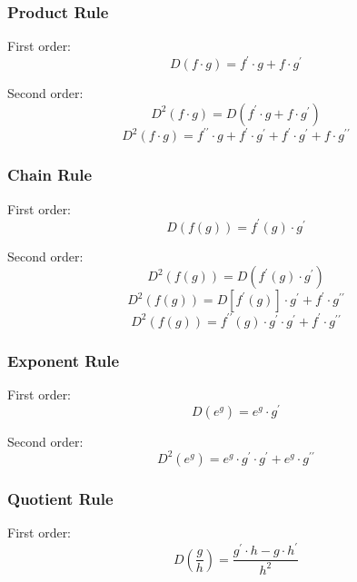 \documentclass[11pt, oneside]{article}
\begin{document}
\subsubsection{Product Rule}

First order:
\begin{equation}
D(f \cdot g) = f^\prime \cdot g + f \cdot g^\prime
\end{equation}

Second order:
\begin{equation}
D^2(f \cdot g) = D(f^\prime \cdot g + f \cdot g^\prime) 
\end{equation}
\begin{equation}
D^2(f \cdot g) = f^{\prime\prime} \cdot g + f^\prime \cdot g^\prime + f^\prime \cdot g^\prime + f \cdot g^{\prime\prime} 
\end{equation}

\subsubsection{Chain Rule}
First order:
\begin{equation}
D(f(g)) = f^\prime (g) \cdot g^\prime
\end{equation}

Second order:
\begin{equation}
D^2(f(g)) = D(f^\prime(g) \cdot g^\prime) 
\end{equation}
\begin{equation}
D^2(f(g)) = D[f^\prime(g)] \cdot g^\prime + f^\prime \cdot g^{\prime\prime} 
\end{equation}
\begin{equation}
D^2(f(g)) = f^{\prime\prime}(g) \cdot g^\prime \cdot g^\prime + f^\prime \cdot g^{\prime\prime} 
\end{equation}

\subsubsection{Exponent Rule}
First order:
\begin{equation}
D(e^g) = e^g \cdot g^\prime
\end{equation}

Second order:
\begin{equation}
D^2(e^g) = e^g \cdot g^\prime \cdot g^\prime + e^g \cdot g^{\prime\prime} 
\end{equation}

\subsubsection{Quotient Rule}
First order:
\begin{equation}
D(\frac{g}{h}) = \frac{g^\prime \cdot h - g \cdot h^\prime}{h^2}
\end{equation}
\end{document}

